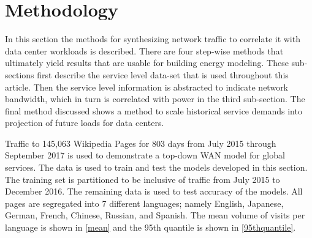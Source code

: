 \section{Methodology} 
    In this section the methods for synthesizing network traffic to correlate it with data center workloads is described. There are four step-wise methods that ultimately yield results that are usable for building energy modeling. These sub-sections first describe the service level data-set that is used throughout this article. Then the service level information is abstracted to indicate network bandwidth, which in turn is correlated with power in the third sub-section. The final method discussed shows a method to scale historical service demands into projection of future loads for data centers.  
    
    

    Traffic to 145,063 Wikipedia Pages for 803 days from July 2015 through September 2017 is used to demonstrate a top-down WAN model for global services. The data is used to train and test the models developed in this section. The training set is partitioned to be inclusive of traffic from July 2015 to December 2016. The remaining data is used to test accuracy of the models. All pages are segregated into 7 different languages; namely English, Japanese, German, French, Chinese, Russian, and Spanish. The mean volume of visits per language is shown in \ref{mean} and the 95th quantile is shown in \ref{95thquantile}.  